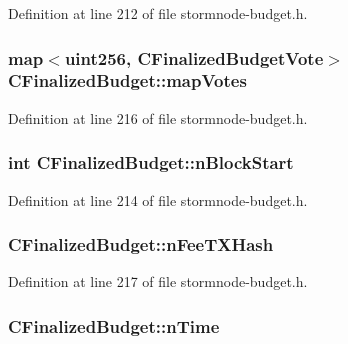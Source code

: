 Definition at line 212 of file stormnode-\/budget.\+h.

\hypertarget{class_c_finalized_budget_a756460095ed59fd39e7f3018b4b208dd}{}
\subsubsection[{map\+Votes}]{\setlength{\rightskip}{0pt plus 5cm}map$<${\bf uint256}, {\bf C\+Finalized\+Budget\+Vote}$>$ C\+Finalized\+Budget\+::map\+Votes}\label{class_c_finalized_budget_a756460095ed59fd39e7f3018b4b208dd}


Definition at line 216 of file stormnode-\/budget.\+h.

\hypertarget{class_c_finalized_budget_a1d04c262e10f4588b17eb3aba5ed9b52}{}
\subsubsection[{n\+Block\+Start}]{\setlength{\rightskip}{0pt plus 5cm}int C\+Finalized\+Budget\+::n\+Block\+Start}\label{class_c_finalized_budget_a1d04c262e10f4588b17eb3aba5ed9b52}


Definition at line 214 of file stormnode-\/budget.\+h.

\hypertarget{class_c_finalized_budget_a699a2f3cbea723957c2a944b08484bb5}{}
\subsubsection[{n\+Fee\+T\+X\+Hash}]{ C\+Finalized\+Budget\+::n\+Fee\+T\+X\+Hash}\label{class_c_finalized_budget_a699a2f3cbea723957c2a944b08484bb5}


Definition at line 217 of file stormnode-\/budget.\+h.

\hypertarget{class_c_finalized_budget_a3bb3cb1d44021d5ef9996a81f3e09734}{}
\subsubsection[{n\+Time}]{ C\+Finalized\+Budget\+::n\+Time}\label{class_c_finalized_budget_a3bb3cb1d44021d5ef9996a81f3e09734}


